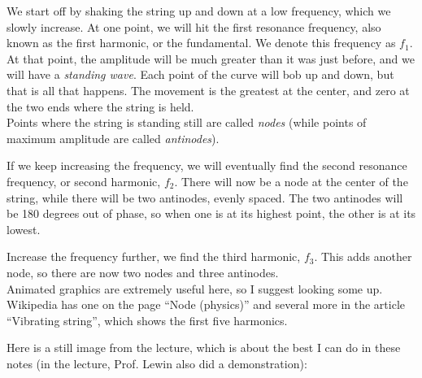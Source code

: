 We start off by shaking the string up and down at a low frequency, which we slowly increase. At one point, we will hit the first resonance frequency, also known as the first harmonic, or the fundamental. We denote this frequency as $f_1$.\\
At that point, the amplitude will be much greater than it was just before, and we will have a \emph{standing wave}. Each point of the curve will bob up and down, but that is all that happens. The movement is the greatest at the center, and zero at the two ends where the string is held.\\
Points where the string is standing still are called \emph{nodes} (while points of maximum amplitude are called \emph{antinodes}).

If we keep increasing the frequency, we will eventually find the second resonance frequency, or second harmonic, $f_2$. There will now be a node at the center of the string, while there will be two antinodes, evenly spaced. The two antinodes will be 180 degrees out of phase, so when one is at its highest point, the other is at its lowest.

Increase the frequency further, we find the third harmonic, $f_3$. This adds another node, so there are now two nodes and three antinodes.\\
Animated graphics are extremely useful here, so I suggest looking some up. Wikipedia has one on the page ``Node (physics)'' and several more in the article ``Vibrating string'', which shows the first five harmonics.

Here is a still image from the lecture, which is about the best I can do in these notes (in the lecture, Prof. Lewin also did a demonstration):

\begin{figure}[H]
  \centering
{}
\end{figure}


